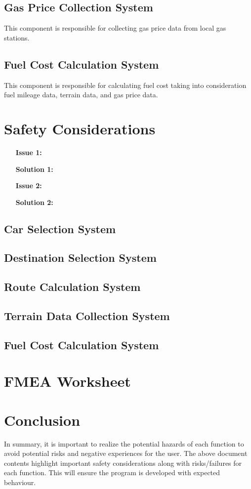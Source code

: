 \documentclass{article}
\begin{document}
\subsection{Gas Price Collection System}
This component is responsible for collecting gas price data from local gas stations.

\subsection{Fuel Cost Calculation System}
This component is responsible for calculating fuel cost taking into consideration fuel mileage data, terrain data, and gas price data.

\section{Safety Considerations}
\begin{itemize}
	\item[\textbf{Issue 1:}]
	\item[\textbf{Solution 1:}]
	\item[\textbf{Issue 2:}]
	\item[\textbf{Solution 2:}]
\end{itemize}

\subsection{Car Selection System}


\subsection{Destination Selection System}

\subsection{Route Calculation System}

\subsection{Terrain Data Collection System}

\subsection{Fuel Cost Calculation System}

\section{FMEA Worksheet}

\section{Conclusion}
In summary, it is important to realize the potential hazards of each function to avoid potential risks and negative experiences for the user. The above document contents highlight
important safety considerations along with risks/failures for each function. This will ensure
the program is developed with expected behaviour.
\end{document}
